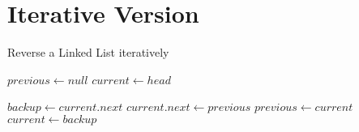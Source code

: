 \documentclass[12pt]{article}
\begin{document}
\section*{Iterative Version}
\begin{algorithm}

  \caption{Reverse a Linked List iteratively}
  
  \begin{algorithmic}[1]
    \Statex
    
        
        \State $previous \gets null$
        \State $current \gets head$
        
            \State $backup \gets current.next$
            \State $current.next \gets previous$
            \State $previous \gets current$
            \State $current \gets backup$
        \EndWhile
        
        \State {} 
    \EndFunction
  \end{algorithmic}
  
\end{algorithm}
\end{document}
